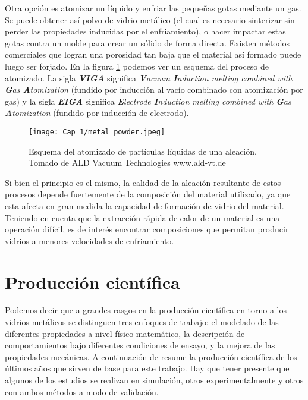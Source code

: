 Otra opción es atomizar un líquido y enfriar las pequeñas gotas mediante un gas. Se puede obtener así polvo de vidrio metálico (el cual es necesario sinterizar sin perder las propiedades inducidas por el enfriamiento), o hacer impactar estas gotas contra un molde para crear un sólido de forma directa. Existen métodos comerciales que logran una porosidad tan baja que el material así formado puede luego ser forjado. En la figura \ref{C1:fg:metal_powder} podemos ver un esquema del proceso de atomizado. La sigla \textbf{\textit{VIGA}} significa \textit{\textbf{V}acuum \textbf{I}nduction melting combined with \textbf{G}as \textbf{A}tomization} (fundido por inducción al vacío combinado con atomización por gas) y la sigla \textbf{\textit{EIGA}} significa \textit{\textbf{E}lectrode \textbf{I}nduction melting combined with \textbf{G}as \textbf{A}tomization} (fundido por inducción de electrodo).

\begin{figure}[h!]
 \centering
 \texttt{[image: Cap\_1/metal\_powder.jpeg]}
 \caption[Atomizado de metal]{Esquema del atomizado de partículas líquidas de una aleación. Tomado de ALD Vacuum Technologies www.ald-vt.de}
 \label{C1:fg:metal_powder}
\end{figure}

Si bien el principio es el mismo, la calidad de la aleación resultante de estos procesos depende fuertemente de la composición del material utilizado, ya que esta afecta en gran medida la capacidad de formación de vidrio del material. Teniendo en cuenta que la extracción rápida de calor de un material es una operación difícil, es de interés encontrar composiciones que permitan producir vidrios a menores velocidades de enfriamiento.

\section{Producción científica}
\label{S1_3}

Podemos decir que a grandes rasgos en la producción científica en torno a los vidrios metálicos se distinguen tres enfoques de trabajo: el modelado de las diferentes propiedades a nivel físico-matemático, la descripción de comportamientos bajo diferentes condiciones de ensayo, y la mejora de las propiedades mecánicas. A continuación de resume la producción científica de los últimos años que sirven de base para este trabajo. Hay que tener presente que algunos de los estudios se realizan en simulación, otros experimentalmente y otros con ambos métodos a modo de validación.

